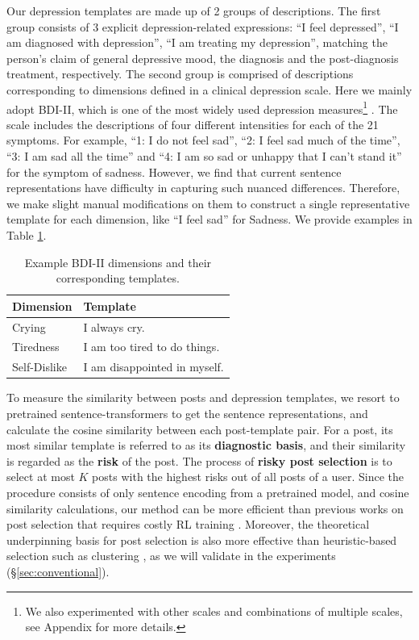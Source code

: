 Our depression templates are made up of 2 groups of descriptions. 
The first group consists of 3 explicit depression-related expressions: 
``I feel depressed'', ``I am diagnosed with depression'', 
``I am treating my depression'', matching the person's claim of 
general depressive mood, the diagnosis and the post-diagnosis treatment,
respectively. The second group is comprised of descriptions corresponding 
to dimensions defined in a clinical depression scale. 
Here we mainly adopt BDI-II, which is one of the most widely used depression 
measures\footnote{We also experimented with other scales and combinations of multiple scales, see Appendix for more details.} \cite{beck1996beck}. 
The scale includes the descriptions of four different intensities for each of the 21 symptoms. For example, ``1: I do not feel sad'', ``2: I feel sad much of the time'', ``3: I am sad all the time'' and ``4: I am so sad or unhappy that I can't stand it'' for the symptom of sadness. However, we find that current sentence representations have difficulty in capturing such nuanced differences. Therefore, we make slight manual modifications on them to construct a single representative template for each dimension, like ``I feel sad'' for Sadness. We provide examples in Table \ref{tab:template_example}.

\begin{table}[h]
    \centering
    \begin{tabular}{l|l}
        \hline
        Dimension & Template \\
        \hline
        Crying & I always cry. \\
        Tiredness  & I am too tired to do things. \\
        Self-Dislike & I am disappointed in myself. \\
        \hline
    \end{tabular}
    \caption{Example BDI-II dimensions and their corresponding templates.}
    \label{tab:template_example}
\end{table}

To measure the similarity between posts and depression templates, we resort to pretrained sentence-transformers \cite{reimers-2019-sentence-bert} to get the sentence representations, and calculate the cosine similarity between each post-template pair. For a post, its most similar template is referred to as its \textbf{diagnostic basis}, and their similarity is regarded as the \textbf{risk} of the post. The process of \textbf{risky post selection} is to select at most $K$ posts with the highest risks out of all posts of a user. Since the procedure consists of only sentence encoding from a pretrained model, and cosine similarity calculations, our method can be more efficient than previous works on post selection that requires costly RL training \cite{gui2019cooperative}. Moreover, the theoretical underpinning basis for post selection is also more effective than heuristic-based selection such as clustering \cite{zogan2021depressionnet}, as we will validate in the experiments (\S \ref{sec:conventional}).

